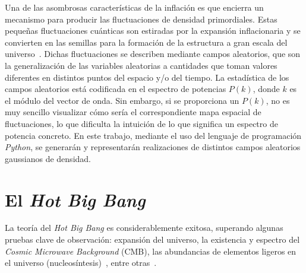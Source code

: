 Una de las asombrosas características de la inflación es que encierra un mecanismo para producir las fluctuaciones de densidad primordiales. Estas pequeñas fluctuaciones cuánticas son estiradas por la expansión inflacionaria y se convierten en las semillas para la formación de la estructura a gran escala del universo~\cite{Mukhanov1981,bardeen1983spontaneous,hawking1982development,starobinsky1982dynamics,guth1985quantum}. Dichas fluctuaciones se describen mediante campos aleatorios, que son la generalización de las variables aleatorias a cantidades que toman valores diferentes en distintos puntos del espacio y/o del tiempo. La estadística de los campos aleatorios está codificada en el espectro de potencias \(P(k)\), donde \(k\) es el módulo del vector de onda.
\newpage
Sin embargo, si se proporciona un \(P(k)\), no es muy sencillo visualizar cómo sería el correspondiente mapa espacial de fluctuaciones, lo que dificulta la intuición de lo que significa un espectro de potencia concreto. En este trabajo, mediante el uso del lenguaje de programación \textit{Python}, se generarán y representarán realizaciones de distintos campos aleatorios gaussianos de densidad.
\clearpage
\section{El \textit{Hot Big Bang}}
La teoría del \textit{Hot Big Bang} es considerablemente exitosa, superando algunas pruebas clave de observación: expansión del universo, la existencia y espectro del \textit{Cosmic Microwave Background} (CMB), las abundancias de elementos ligeros en el universo (nucleosíntesis)~\cite{gamow1946expanding,alpher1948evolution,alpher1953physical}, entre otras~\cite{liddle1998introduction}.


